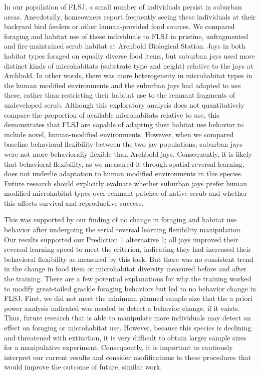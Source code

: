 \documentclass[
]{article}
\begin{document}
In our population of FLSJ, a small number of individuals persist in
suburban areas. Anecdotally, homeowners report frequently seeing these
individuals at their backyard bird feeders or other human-provided food
sources. We compared foraging and habitat use of these individuals to
FLSJ in pristine, unfragmented and fire-maintained scrub habitat at
Archbold Biological Station. Jays in both habitat types foraged on
equally diverse food items, but suburban jays used more distinct kinds
of microhabitats (substrate type and height) relative to the jays at
Archbold. In other words, there was more heterogeneity in microhabitat
types in the human modified environments and the suburban jays had
adapted to use these, rather than restricting their habitat use to the
remnant fragments of undeveloped scrub. Although this exploratory
analysis does not quantitatively compare the proportion of available
microhabitats relative to use, this demonstrates that FLSJ are capable
of adapting their habitat use behavior to include novel, human-modified
environments. However, when we compared baseline behavioral flexibility
between the two jay populations, suburban jays were not more
behaviorally flexible than Archbold jays. Consequently, it is likely
that behavioral flexibility, as we measured it through spatial reversal
learning, does not underlie adaptation to human modified environments in
this species. Future research should explicitly evaluate whether
suburban jays prefer human modified microhabitat types over remnant
patches of native scrub and whether this affects survival and
reproductive success.

This was supported by our finding of no change in foraging and habitat
use behavior after undergoing the serial reversal learning flexibility
manipulation. Our results supported our Prediction 1 alternative 1; all
jays improved their reversal learning speed to meet the criterion,
indicating they had increased their behavioral flexibility as measured
by this task. But there was no consistent trend in the change in food
item or microhabitat diversity measured before and after the training.
There are a few potential explanations for why the training worked to
modify great-tailed grackle foraging behaviors but led to no behavior
change in FLSJ. First, we did not meet the minimum planned sample size
that the a priori power analysis indicated was needed to detect a
behavior change, if it exists. Thus, future research that is able to
manipulate more individuals may detect an effect on foraging or
microhabitat use. However, because this species is declining and
threatened with extinction, it is very difficult to obtain larger sample
sizes for a manipulative experiment. Consequently, it is important to
cautiously interpret our current results and consider modifications to
these procedures that would improve the outcome of future, similar work.
\end{document}
